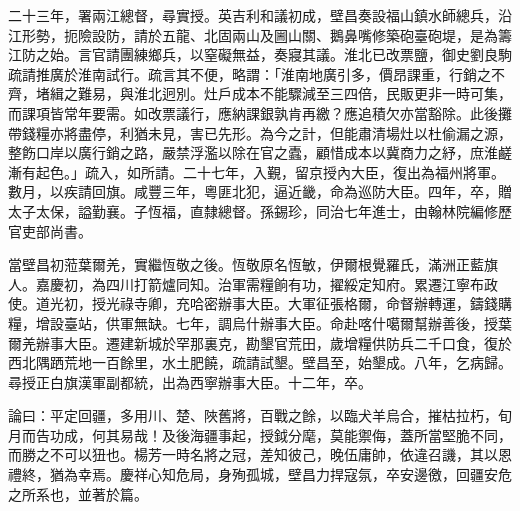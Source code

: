 \begin{pinyinscope}
二十三年，署兩江總督，尋實授。英吉利和議初成，壁昌奏設福山鎮水師總兵，沿江形勢，扼險設防，請於五龍、北固兩山及圌山關、鵝鼻嘴修築砲臺砲堤，是為籌江防之始。言官請團練鄉兵，以窒礙無益，奏寢其議。淮北已改票鹽，御史劉良駒疏請推廣於淮南試行。疏言其不便，略謂：「淮南地廣引多，價昂課重，行銷之不齊，堵緝之難易，與淮北迥別。灶戶成本不能驟減至三四倍，民販更非一時可集，而課項皆常年要需。如改票議行，應納課銀孰肯再繳？應追積欠亦當豁除。此後攤帶錢糧亦將盡停，利猶未見，害已先形。為今之計，但能肅清場灶以杜偷漏之源，整飭口岸以廣行銷之路，嚴禁浮濫以除在官之蠹，顧惜成本以冀商力之紓，庶淮鹺漸有起色。」疏入，如所請。二十七年，入覲，留京授內大臣，復出為福州將軍。數月，以疾請回旗。咸豐三年，粵匪北犯，逼近畿，命為巡防大臣。四年，卒，贈太子太保，謚勤襄。子恆福，直隸總督。孫錫珍，同治七年進士，由翰林院編修歷官吏部尚書。

當壁昌初蒞葉爾羌，實繼恆敬之後。恆敬原名恆敏，伊爾根覺羅氏，滿洲正藍旗人。嘉慶初，為四川打箭爐同知。治軍需糧餉有功，擢綏定知府。累遷江寧布政使。道光初，授光祿寺卿，充哈密辦事大臣。大軍征張格爾，命督辦轉運，鑄錢購糧，增設臺站，供軍無缺。七年，調烏什辦事大臣。命赴喀什噶爾幫辦善後，授葉爾羌辦事大臣。遷建新城於罕那裏克，勘墾官荒田，歲增糧供防兵二千口食，復於西北隅跴荒地一百餘里，水土肥饒，疏請試墾。壁昌至，始墾成。八年，乞病歸。尋授正白旗漢軍副都統，出為西寧辦事大臣。十二年，卒。

論曰：平定回疆，多用川、楚、陜舊將，百戰之餘，以臨犬羊烏合，摧枯拉朽，旬月而告功成，何其易哉！及後海疆事起，授鉞分麾，莫能禦侮，蓋所當堅脆不同，而勝之不可以狃也。楊芳一時名將之冠，差知彼己，晚伍庸帥，依違召譏，其以恩禮終，猶為幸焉。慶祥心知危局，身殉孤城，壁昌力捍寇氛，卒安邊徼，回疆安危之所系也，並著於篇。


\end{pinyinscope}